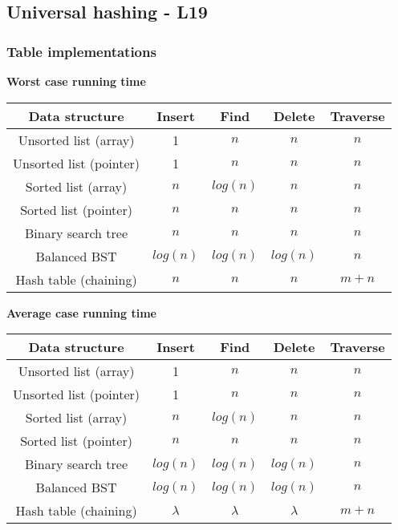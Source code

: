 \documentclass[a4paper]{article}
\begin{document}
\subsection*{Universal hashing - L19}
\subsubsection*{Table implementations}
\begin{center}
    \textbf{Worst case running time}\\
    \begin{tabular}{||c c c c c||} 
    \hline
    Data structure & Insert & Find & Delete & Traverse \\ [0.5ex] 
    \hline
    Unsorted list (array) & 1 & $n$ & $n$ &  $n$ \\ 
    \hline
    Unsorted list (pointer) & 1 & $n$ & $n$ &  $n$\\
    \hline
    Sorted list (array) & $n$ & $log(n)$ & $n$ &  $n$\\
    \hline
    Sorted list (pointer) & $n$ & $n$ & $n$ &  $n$\\
    \hline
    Binary search tree & $n$ & $n$ & $n$ &  $n$\\ 
    \hline
    Balanced BST & $log(n)$ & $log(n)$ & $log(n)$ &  $n$\\
    \hline
    Hash table (chaining) & $n$ & $n$ & $n$ &  $m+n$\\
    \hline
   \end{tabular}
\end{center}
\begin{center}
    \textbf{Average case running time}\\
    \begin{tabular}{||c c c c c||} 
    \hline
    Data structure & Insert & Find & Delete & Traverse \\ [0.5ex] 
    \hline
    Unsorted list (array) & 1 & $n$ & $n$ &  $n$ \\ 
    \hline
    Unsorted list (pointer) & 1 & $n$ & $n$ &  $n$\\
    \hline
    Sorted list (array) & $n$ & $log(n)$ & $n$ &  $n$\\
    \hline
    Sorted list (pointer) & $n$ & $n$ & $n$ &  $n$\\
    \hline
    Binary search tree & $log(n)$ & $log(n)$ & $log(n)$ &  $n$\\ 
    \hline
    Balanced BST & $log(n)$ & $log(n)$ & $log(n)$ &  $n$\\
    \hline
    Hash table (chaining) & $\lambda$ & $\lambda$ & $\lambda$ &  $m+n$\\
    \hline
   \end{tabular}
\end{center}
\end{document}
